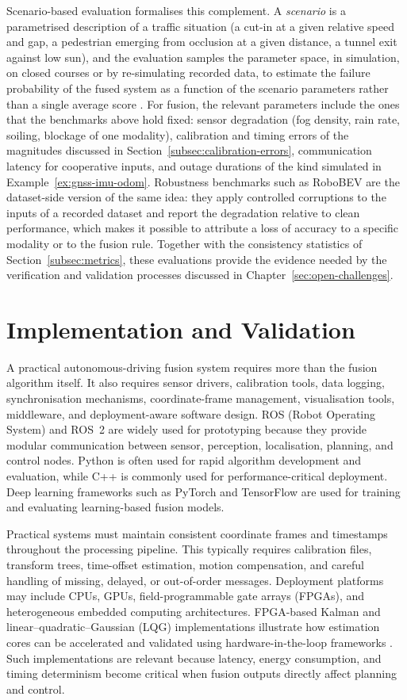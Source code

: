 \documentclass[graybox,envcountchap]{style/SNmono}
\begin{document}
Scenario-based evaluation formalises this complement. A \emph{scenario} is a parametrised description of a traffic situation (a cut-in at a given relative speed and gap, a pedestrian emerging from occlusion at a given distance, a tunnel exit against low sun), and the evaluation samples the parameter space, in simulation, on closed courses or by re-simulating recorded data, to estimate the failure probability of the fused system as a function of the scenario parameters rather than a single average score \cite{riedmaier2020_scenario}. For fusion, the relevant parameters include the ones that the benchmarks above hold fixed: sensor degradation (fog density, rain rate, soiling, blockage of one modality), calibration and timing errors of the magnitudes discussed in Section~\ref{subsec:calibration-errors}, communication latency for cooperative inputs, and outage durations of the kind simulated in Example~\ref{ex:gnss-imu-odom}. Robustness benchmarks such as RoboBEV \cite{dong2023_robobev} are the dataset-side version of the same idea: they apply controlled corruptions to the inputs of a recorded dataset and report the degradation relative to clean performance, which makes it possible to attribute a loss of accuracy to a specific modality or to the fusion rule. Together with the consistency statistics of Section~\ref{subsec:metrics}, these evaluations provide the evidence needed by the verification and validation processes discussed in Chapter~\ref{sec:open-challenges}.

\section{Implementation and Validation}

A practical autonomous-driving fusion system requires more than the fusion algorithm itself. It also requires sensor drivers, calibration tools, data logging, synchronisation mechanisms, coordinate-frame management, visualisation tools, middleware, and deployment-aware software design. ROS (Robot Operating System) and ROS~2 are widely used for prototyping because they provide modular communication between sensor, perception, localisation, planning, and control nodes. Python is often used for rapid algorithm development and evaluation, while C++ is commonly used for performance-critical deployment. Deep learning frameworks such as PyTorch and TensorFlow are used for training and evaluating learning-based fusion models.

Practical systems must maintain consistent coordinate frames and timestamps throughout the processing pipeline. This typically requires calibration files, transform trees, time-offset estimation, motion compensation, and careful handling of missing, delayed, or out-of-order messages. Deployment platforms may include CPUs, GPUs, field-programmable gate arrays (FPGAs), and heterogeneous embedded computing architectures. FPGA-based Kalman and linear--quadratic--Gaussian (LQG) implementations illustrate how estimation cores can be accelerated and validated using hardware-in-the-loop frameworks \cite{deliparaschos2016_jee_fpga}. Such implementations are relevant because latency, energy consumption, and timing determinism become critical when fusion outputs directly affect planning and control.
\end{document}
